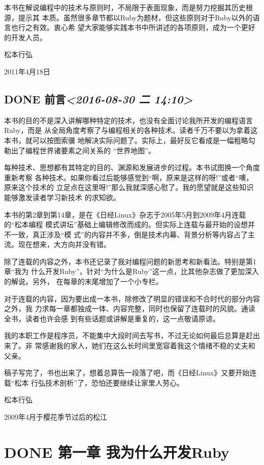 \documentclass[11pt]{ctexart}
\begin{document}
本书在解说编程中的技术与原则时，不局限于表面现象，而是努力挖掘其历史根源，提示其
本质。虽然很多章节都以Ruby为题材，但这些原则对于Ruby以外的语言也行之有效。衷心希
望大家能够实践本书中所讲述的各项原则，成为一个更好的开发人员。

松本行弘

2011年4月18日
\begin{LaTeX}
\newpage
\end{LaTeX}

\subsection{{\bfseries\sffamily DONE} 前言\textit{<2016-08-30 二 14:10>}}
\label{sec:org16054cb}
本书的目的不是深入讲解哪种特定的技术，也没有全面讨论我所开发的编程语言Ruby，而是
从全局角度考察了与编程相关的各种技术。读者千万不要以为拿着这本书，就可以按图索骥
地解决实际问题了。实际上，最好反它看成是一幅粗略勾勒出了编程世界诸要素之间关系的
“世界地图”。

每种技术、思想都有其特定的目的、渊源和发展进步的过程。本书试图换一个角度重新考察
各种技术。如果你看过后能够感觉到“啊，原来是这样的呀!”或者“噢，原来这个技术的
立足点在这里呀!”那么我就深感心慰了。我的愿望就是这些知识能够激发读者学习新技术
的求知欲。

本书的第2章到第14章，是在《日经Linux》杂志于2005年5月到2009年4月连载的“松本编程
模式讲坛”基础上编辑修改而成的。但实际上连载与最开始的设想并不一致，真正涉及“模
式”的内容并不多，倒是技术内幕、背景分析等内容占了主流。现在想来，大方向并没有错。

除了连载的内容之外，本书还记录了我对编程问题的新思考和新看法。特别是第1章“我为
什么开发Ruby”，针对“为什么是Ruby”这一点，比其他杂志做了更加深入的解说。另外，
在每章的末尾增加了一个小专栏。

对于连载的内容，因为要出成一本书，除修改了明显的错误和不合时代的部分内容之外，我
力求每一章都独成一体、内容完整，同时也保留了连载时的风貌。通读全书，读者也许会感
到有些话题或讲解是重复的，这一点敬请原谅。

我的本职工作是程序员，不能集中大段时间去写书，不过无论如何最后总算是赶出来了。非
常感谢我的家人，她们在这么长时间里宽容着我这个情绪不稳的丈夫和父亲。

稿子写完了，书也出来了，想着总算告一段落了吧，而《日经Linux》又要开始连载“松本
行弘技术剖析”了，恐怕还要继续让家里人劳心。

松本行弘

2009年4月于樱花季节过后的松江


\section{{\bfseries\sffamily DONE} 第一章 我为什么开发Ruby}
\label{sec:org20684a5}
\end{document}
